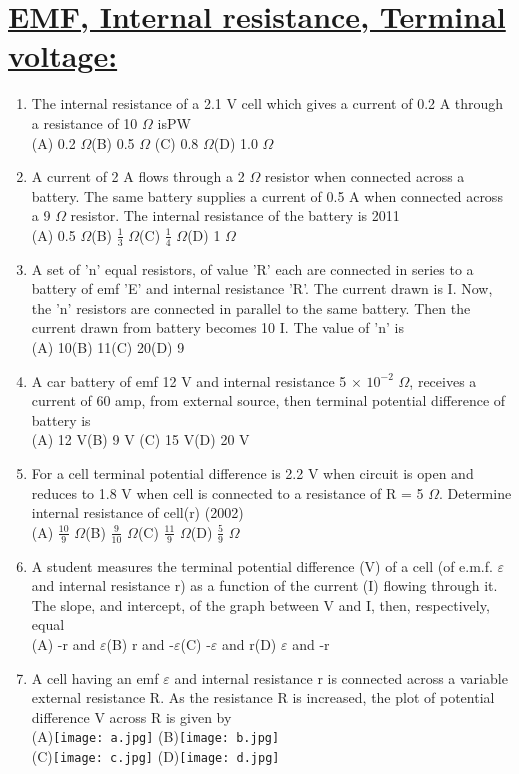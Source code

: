 \documentclass[12pt]{article}
\begin{document}
\section{\underline{EMF, Internal resistance, Terminal voltage:}}
\Large{\begin{enumerate}
\item The internal resistance of a 2.1 V cell which gives a current of 0.2 A through a resistance of 10 \(\Omega\) is\hfill{\small PW}\\ \quad (A) 0.2 \(\Omega\)\quad\quad (B) 0.5 \(\Omega\) \quad (C) 0.8 \(\Omega\)\quad\quad (D) 1.0 \(\Omega \)\\
\item A current of 2 A flows through a 2 \(\Omega\) resistor when connected across a battery. The same battery supplies a current of 0.5 A when connected across a 9 \( \Omega\) resistor. The internal resistance of the battery is \hfill{\small2011}\\\quad(A) 0.5 \(\Omega\)\quad (B) \(\frac{1}{3}\) \(\Omega\)\quad (C) \(\frac{1}{4}\) \(\Omega\)\quad (D) 1 $\Omega$\quad\\
\item A set of 'n' equal resistors, of value 'R' each are connected in series to a battery of emf 'E' and internal resistance 'R'. The current drawn is I. Now, the 'n' resistors are connected in parallel to the same battery. Then the current drawn from battery becomes 10 I. The value of 'n' is\\
		 (A) 10\quad (B) 11\quad (C) 20\quad (D) 9\quad
\item A car battery of emf 12 V and internal resistance 5 \(\times\) \(10^{-2}\) \(\Omega\), receives a current of 60 amp, from external source, then terminal potential difference of battery is\\
(A) 12 V\quad (B) 9 V\quad
(C) 15 V\quad (D) 20 V\quad
\item For a cell terminal potential difference is 2.2 V
when circuit is open and reduces to 1.8 V
when cell is connected to a resistance of
R = 5 \(\Omega\). Determine internal resistance of
cell(r) \hfill(2002)\\
(A) \(\frac{10}{9}\) \(\Omega\)\quad (B) \(\frac{9}{10}\) \(\Omega\)\quad (C) \(\frac{11}{9}\) \(\Omega\)\quad(D) \(\frac{5}{9}\) \(\Omega\)
\item A student measures the terminal potential
difference (V) of a cell (of e.m.f. \(\varepsilon\) and internal
resistance r) as a function of the current (I)
flowing through it. The slope, and intercept, of
the graph between V and I, then, respectively,
equal\\
(A) -r and \(\varepsilon\)\quad (B) r and -\(\varepsilon\)\quad (C) -\(\varepsilon\) and r\quad (D) \(\varepsilon\) and -r
\item A cell having an emf $\varepsilon$ and internal resistance
r is connected across a variable external
resistance R. As the resistance R is increased,
the plot of potential difference V across R is
given by\\
(A)\texttt{[image: a.jpg]}
(B)\texttt{[image: b.jpg]}\\
(C)\texttt{[image: c.jpg]} 
(D)\texttt{[image: d.jpg]}


\end{enumerate}}
\end{document}
